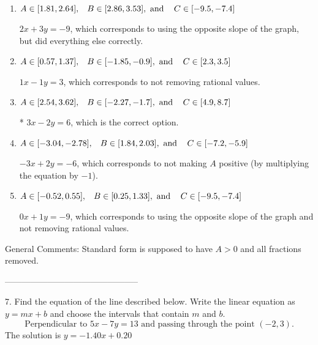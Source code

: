 \documentclass{article}[14pt]
\begin{document}
\begin{enumerate}[label=\Alph*.] 
\item $ A \in [1.81, 2.64], \hspace{3mm} B \in [2.86, 3.53], \text{ and } \hspace{3mm} C \in [-9.5, -7.4] $ 

  $2x + 3y = -9$, which corresponds to using the opposite slope of the graph, but did everything else correctly. 
\item $ A \in [0.57, 1.37], \hspace{3mm} B \in [-1.85, -0.9], \text{ and } \hspace{3mm} C \in [2.3, 3.5] $ 

  $1x - 1y = 3$, which corresponds to not removing rational values. 
\item $ A \in [2.54, 3.62], \hspace{3mm} B \in [-2.27, -1.7], \text{ and } \hspace{3mm} C \in [4.9, 8.7] $ 

 * $3x - 2y = 6$, which is the correct option. 
\item $ A \in [-3.04, -2.78], \hspace{3mm} B \in [1.84, 2.03], \text{ and } \hspace{3mm} C \in [-7.2, -5.9] $ 

  $-3x + 2y = -6$, which corresponds to not making $A$ positive (by multiplying the equation by $-1$). 
\item $ A \in [-0.52, 0.55], \hspace{3mm} B \in [0.25, 1.33], \text{ and } \hspace{3mm} C \in [-9.5, -7.4] $ 

  $0x + 1y = -9$, which corresponds to using the opposite slope of the graph and not removing rational values. 
\end{enumerate} 
 
General Comments: Standard form is supposed to have $A > 0$ and all fractions removed.

-----------------------------------------------

7. Find the equation of the line described below. Write the linear equation as $ y=mx+b $ and choose the intervals that contain $m$ and $b$.
$$ \text{Perpendicular to } 5 x - 7 y = 13 \text{ and passing through the point } (-2, 3). $$ 
The solution is $ y = -1.40x + 0.20 $ 
\end{document}
